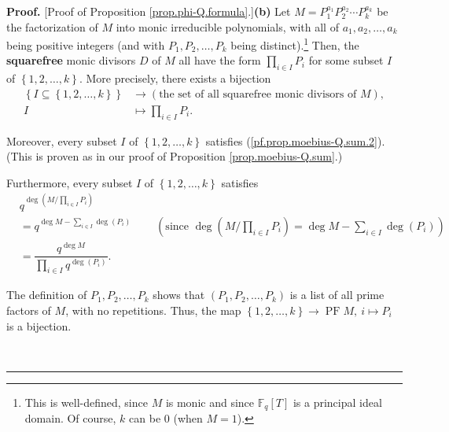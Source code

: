 \documentclass[numbers=enddot,12pt,final,onecolumn,notitlepage]{scrartcl}%
\theoremstyle{definition}
\newenvironment{proof}[1][Proof]{\noindent\textbf{#1.} }{\ \rule{0.5em}{0.5em}}
\let\sumnonlimits\sum
\let\prodnonlimits\prod
\renewcommand{\sum}{\sumnonlimits\limits}
\renewcommand{\prod}{\prodnonlimits\limits}
\begin{document}
\begin{proof}
[Proof of Proposition \ref{prop.phi-Q.formula}.]\textbf{(b)} Let
$M=P_{1}^{a_{1}}P_{2}^{a_{2}}\cdots P_{k}^{a_{k}}$ be the factorization of $M$
into monic irreducible polynomials, with all of $a_{1},a_{2},\ldots,a_{k}$
being positive integers (and with $P_{1},P_{2},\ldots,P_{k}$ being
distinct).\footnote{This is well-defined, since $M$ is monic and since
$\mathbb{F}_{q}\left[  T\right]  $ is a principal ideal domain. Of course, $k$
can be $0$ (when $M=1$).} Then, the \textbf{squarefree} monic divisors $D$ of
$M$ all have the form $\prod_{i\in I}P_{i}$ for some subset $I$ of $\left\{
1,2,\ldots,k\right\}  $. More precisely, there exists a bijection%
\begin{align}
\left\{  I\subseteq\left\{  1,2,\ldots,k\right\}  \right\}   &  \rightarrow
\left(  \text{the set of all squarefree monic divisors of }M\right)
,\nonumber\\
I  &  \mapsto\prod_{i\in I}P_{i}. \label{pf.prop.phi-Q.formula.b.bij}%
\end{align}


Moreover, every subset $I$ of $\left\{  1,2,\ldots,k\right\}  $ satisfies
(\ref{pf.prop.moebius-Q.sum.2}). (This is proven as in our proof of
Proposition \ref{prop.moebius-Q.sum}.)

Furthermore, every subset $I$ of $\left\{  1,2,\ldots,k\right\}  $ satisfies%
\begin{align}
&  q^{\deg\left(  M/\prod_{i\in I}P_{i}\right)  }\nonumber\\
&  =q^{\deg M-\sum_{i\in I}\deg\left(  P_{i}\right)  }%
\ \ \ \ \ \ \ \ \ \ \left(  \text{since }\deg\left(  M/\prod_{i\in I}%
P_{i}\right)  =\deg M-\sum_{i\in I}\deg\left(  P_{i}\right)  \right)
\nonumber\\
&  =\dfrac{q^{\deg M}}{\prod_{i\in I}q^{\deg\left(  P_{i}\right)  }%
}.\label{pf.prop.phi-Q.formula.b.qdeg}%
\end{align}


The definition of $P_{1},P_{2},\ldots,P_{k}$ shows that $\left(  P_{1}%
,P_{2},\ldots,P_{k}\right)  $ is a list of all prime factors of $M$, with no
repetitions. Thus, the map $\left\{  1,2,\ldots,k\right\}  \rightarrow
\operatorname*{PF}M,\ i\mapsto P_{i}$ is a bijection.


\end{proof}
\end{document}

